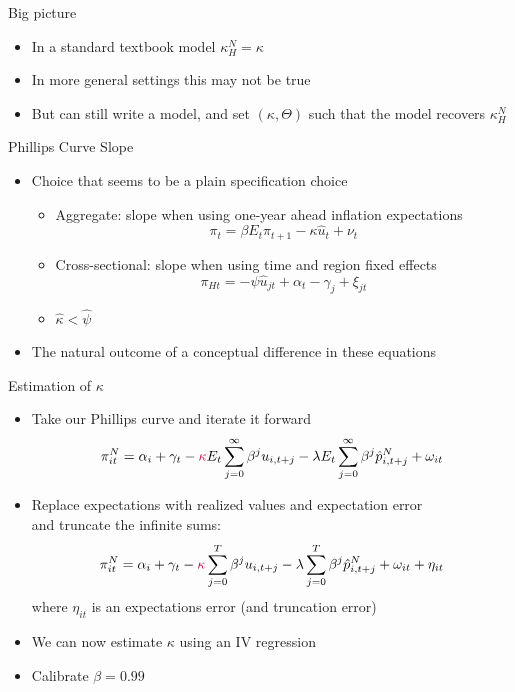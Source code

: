 \documentclass[english,xcolor=svgnames]{beamer}
\begin{document}
\begin{frame}{Big picture}
\begin{itemize}
\item In a standard textbook model $\kappa^N_H = \kappa$
\item In more general settings this may not be true
\item But can still write a model, and set $(\kappa,\Theta)$ such that the model recovers $\kappa^N_H$
\end{itemize}
\end{frame}


\begin{frame}{Phillips Curve Slope}
\begin{itemize}
\item Choice that seems to be a plain specification choice
\begin{itemize}
\item Aggregate: slope when using one-year ahead inflation expectations
	\[ \pi_{t} = \beta E_{t} \pi_{t+1} - \kappa \hat{u}_{t}  + \nu_{t} \] \vspace{-10pt}
\item Cross-sectional: slope when using time and region fixed effects
	\[ \pi_{Ht} =  - \psi \hat{u}_{jt}  + \alpha_t - \gamma_j + \xi_{jt} \] \vspace{-10pt}
\item $\hat{\kappa} < \hat{\psi}$ 
\end{itemize}
\item The natural outcome of a conceptual difference in these equations
\end{itemize}
\end{frame}

\begin{frame}{Estimation of  $\kappa$}
\begin{itemize}
\item Take our Phillips curve and iterate it forward
	\[\pi_{it}^N = \alpha_i + \gamma _t - \textcolor{purple}{{\kappa}} E_t \sum_{j=0}^{\infty} \beta^j u_{i,t+j} - \lambda E_t \sum_{j=0}^{\infty} \beta^j \hat{p}^N_{i,t+j} + \omega_{it} \] \vspace{-10pt}
		\item Replace expectations with realized values and expectation error \\ and truncate the infinite sums:
		\[\pi_{it}^N = \alpha_i + \gamma _t - \textcolor{purple}{{\kappa}} \sum_{j=0}^{T} \beta^j u_{i,t+j} - \lambda \sum_{j=0}^{T} \beta^j \hat{p}^N_{i,t+j} + \omega_{it} + \eta_{it} \]
		where $\eta_{it}$ is an expectations error (and truncation error)
		\item We can now estimate $\kappa$ using an IV regression \vspace{5pt}
		\item Calibrate $\beta = 0.99$
	\end{itemize}
\end{frame}
\end{document}
